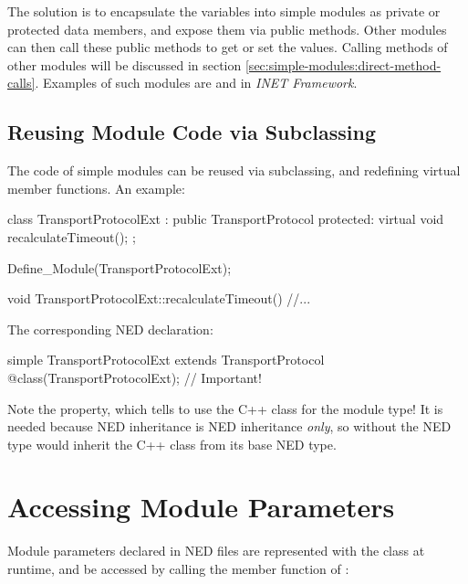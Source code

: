 The solution is to encapsulate the variables into simple modules
as private or protected data members, and expose them via public methods.
Other modules can then call these public methods to get or set the values.
Calling methods of other modules will be discussed in section
\ref{sec:simple-modules:direct-method-calls}.
Examples of such modules are  and 
in \textit{INET Framework}.


\subsection{Reusing Module Code via Subclassing}
\label{sec:simple-modules:module-subclassing}

The code of simple modules can be reused via subclassing, and redefining
virtual member functions. An example:

\begin{cpp}
class TransportProtocolExt : public TransportProtocol
{
  protected:
    virtual void recalculateTimeout();
};

Define_Module(TransportProtocolExt);

void TransportProtocolExt::recalculateTimeout()
{
    //...
}
\end{cpp}

The corresponding NED declaration:

\begin{ned}
simple TransportProtocolExt extends TransportProtocol
{
    @class(TransportProtocolExt);  // Important!
}
\end{ned}

\begin{note}
  Note the  property, which tells {\opp} to use the
   C++ class for the module type! It is needed
  because NED inheritance is NED inheritance \textit{only}, so without 
  the  NED type would inherit the C++ class from
  its base NED type.
\end{note}



\section{Accessing Module Parameters}
\label{sec:simple-modules:parameters}

Module parameters declared in NED files are represented with the 
class at runtime, and be accessed
by calling the  member function of :

